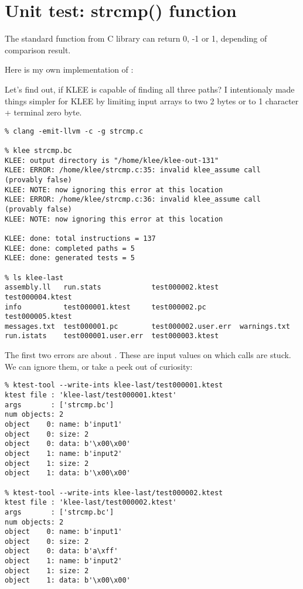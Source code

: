 \section{Unit test: strcmp() function}

The standard  function from C library can return 0, -1 or 1, depending of comparison result.

Here is my own implementation of :



Let's find out, if KLEE is capable of finding all three paths?
I intentionaly made things simpler for KLEE by limiting input arrays to two 2 bytes or to 1 character + terminal zero byte.

\begin{lstlisting}
% clang -emit-llvm -c -g strcmp.c

% klee strcmp.bc
KLEE: output directory is "/home/klee/klee-out-131"
KLEE: ERROR: /home/klee/strcmp.c:35: invalid klee_assume call (provably false)
KLEE: NOTE: now ignoring this error at this location
KLEE: ERROR: /home/klee/strcmp.c:36: invalid klee_assume call (provably false)
KLEE: NOTE: now ignoring this error at this location

KLEE: done: total instructions = 137
KLEE: done: completed paths = 5
KLEE: done: generated tests = 5

% ls klee-last
assembly.ll   run.stats            test000002.ktest     test000004.ktest
info          test000001.ktest     test000002.pc        test000005.ktest
messages.txt  test000001.pc        test000002.user.err  warnings.txt
run.istats    test000001.user.err  test000003.ktest
\end{lstlisting}

The first two errors are about .
These are input values on which  calls are stuck.
We can ignore them, or take a peek out of curiosity:

\begin{lstlisting}
% ktest-tool --write-ints klee-last/test000001.ktest
ktest file : 'klee-last/test000001.ktest'
args       : ['strcmp.bc']
num objects: 2
object    0: name: b'input1'
object    0: size: 2
object    0: data: b'\x00\x00'
object    1: name: b'input2'
object    1: size: 2
object    1: data: b'\x00\x00'

% ktest-tool --write-ints klee-last/test000002.ktest
ktest file : 'klee-last/test000002.ktest'
args       : ['strcmp.bc']
num objects: 2
object    0: name: b'input1'
object    0: size: 2
object    0: data: b'a\xff'
object    1: name: b'input2'
object    1: size: 2
object    1: data: b'\x00\x00'
\end{lstlisting}

